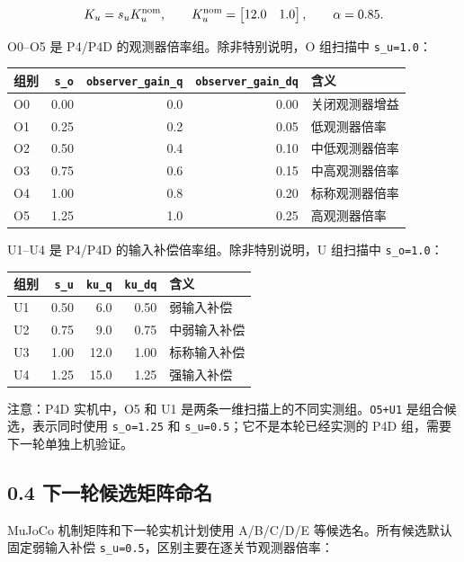 \[
K_u=s_uK_u^{\rm nom},\qquad
K_u^{\rm nom}=
\begin{bmatrix}
12.0 & 1.0
\end{bmatrix},
\qquad \alpha=0.85.
\]

O0--O5 是 P4/P4D 的观测器倍率组。除非特别说明，O 组扫描中 \texttt{s\_u=1.0}：

\begin{longtable}[]{@{}lrrrl@{}}
\toprule\noalign{}
组别 & \texttt{s\_o} & \texttt{observer\_gain\_q} & \texttt{observer\_gain\_dq} & 含义 \\
\midrule\noalign{}
\endhead
\bottomrule\noalign{}
\endlastfoot
O0 & 0.00 & 0.0 & 0.00 & 关闭观测器增益 \\
O1 & 0.25 & 0.2 & 0.05 & 低观测器倍率 \\
O2 & 0.50 & 0.4 & 0.10 & 中低观测器倍率 \\
O3 & 0.75 & 0.6 & 0.15 & 中高观测器倍率 \\
O4 & 1.00 & 0.8 & 0.20 & 标称观测器倍率 \\
O5 & 1.25 & 1.0 & 0.25 & 高观测器倍率 \\
\end{longtable}

U1--U4 是 P4/P4D 的输入补偿倍率组。除非特别说明，U 组扫描中 \texttt{s\_o=1.0}：

\begin{longtable}[]{@{}lrrrl@{}}
\toprule\noalign{}
组别 & \texttt{s\_u} & \texttt{ku\_q} & \texttt{ku\_dq} & 含义 \\
\midrule\noalign{}
\endhead
\bottomrule\noalign{}
\endlastfoot
U1 & 0.50 & 6.0 & 0.50 & 弱输入补偿 \\
U2 & 0.75 & 9.0 & 0.75 & 中弱输入补偿 \\
U3 & 1.00 & 12.0 & 1.00 & 标称输入补偿 \\
U4 & 1.25 & 15.0 & 1.25 & 强输入补偿 \\
\end{longtable}

注意：P4D 实机中，O5 和 U1 是两条一维扫描上的不同实测组。\texttt{O5+U1} 是组合候选，表示同时使用 \texttt{s\_o=1.25} 和 \texttt{s\_u=0.5}；它不是本轮已经实测的 P4D 组，需要下一轮单独上机验证。

\subsection{0.4 下一轮候选矩阵命名}\label{ux4e0bux4e00ux8f6eux5019ux9009ux77e9ux9635ux547dux540d}

MuJoCo 机制矩阵和下一轮实机计划使用 A/B/C/D/E 等候选名。所有候选默认固定弱输入补偿 \texttt{s\_u=0.5}，区别主要在逐关节观测器倍率：

